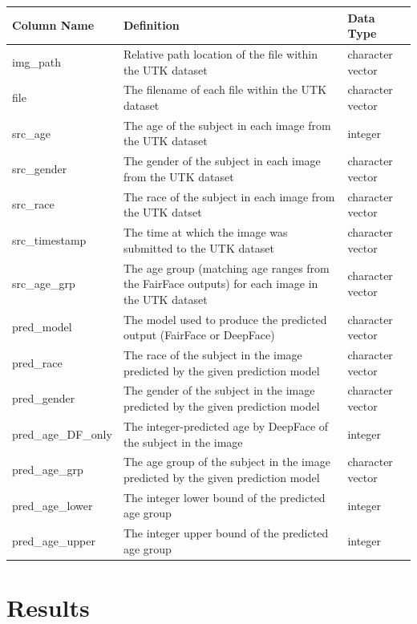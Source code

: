 \documentclass[
  letterpaper,
  DIV=11,
  numbers=noendperiod]{scrreprt}
\begin{document}
\begin{longtable}[]{@{}lll@{}}
\toprule\noalign{}
Column Name & Definition & Data Type \\
\midrule\noalign{}
\endhead
\bottomrule\noalign{}
\endlastfoot
img\_path & Relative path location of the file within the UTK dataset &
character vector \\
file & The filename of each file within the UTK dataset & character
vector \\
src\_age & The age of the subject in each image from the UTK dataset &
integer \\
src\_gender & The gender of the subject in each image from the UTK
dataset & character vector \\
src\_race & The race of the subject in each image from the UTK datset &
character vector \\
src\_timestamp & The time at which the image was submitted to the UTK
dataset & character vector \\
src\_age\_grp & The age group (matching age ranges from the FairFace
outputs) for each image in the UTK dataset & character vector \\
pred\_model & The model used to produce the predicted output (FairFace
or DeepFace) & character vector \\
pred\_race & The race of the subject in the image predicted by the given
prediction model & character vector \\
pred\_gender & The gender of the subject in the image predicted by the
given prediction model & character vector \\
pred\_age\_DF\_only & The integer-predicted age by DeepFace of the
subject in the image & integer \\
pred\_age\_grp & The age group of the subject in the image predicted by
the given prediction model & character vector \\
pred\_age\_lower & The integer lower bound of the predicted age group &
integer \\
pred\_age\_upper & The integer upper bound of the predicted age group &
integer \\
\end{longtable}


\hypertarget{results}{%
\chapter{Results}\label{results}}
\end{document}

